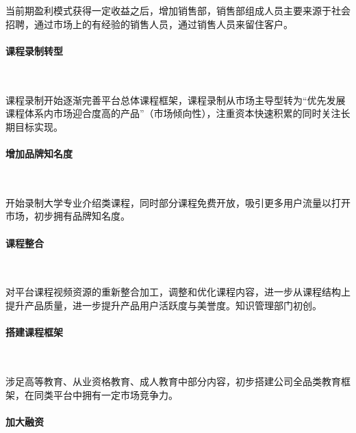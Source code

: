 当前期盈利模式获得一定收益之后，增加销售部，销售部组成人员主要来源于社会招聘，通过市场上的有经验的销售人员，通过销售人员来留住客户。

\paragraph{课程录制转型}\

课程录制开始逐渐完善平台总体课程框架，课程录制从市场主导型转为“优先发展课程体系内市场迎合度高的产品”（市场倾向性），注重资本快速积累的同时关注长期目标实现。

\paragraph{增加品牌知名度}\

开始录制大学专业介绍类课程，同时部分课程免费开放，吸引更多用户流量以打开市场，初步拥有品牌知名度。

\paragraph{课程整合}\

对平台课程视频资源的重新整合加工，调整和优化课程内容，进一步从课程结构上提升产品质量，进一步提升产品用户活跃度与美誉度。知识管理部门初创。

\paragraph{搭建课程框架}\

涉足高等教育、从业资格教育、成人教育中部分内容，初步搭建公司全品类教育框架，在同类平台中拥有一定市场竞争力。

\paragraph{加大融资}\

